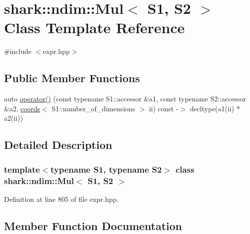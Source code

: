 \hypertarget{classshark_1_1ndim_1_1_mul}{}\section{shark\+:\+:ndim\+:\+:Mul$<$ S1, S2 $>$ Class Template Reference}
\label{classshark_1_1ndim_1_1_mul}


{\ttfamily \#include $<$expr.\+hpp$>$}

\subsection*{Public Member Functions}
\begin{DoxyCompactItemize}
\item 
auto \hyperlink{classshark_1_1ndim_1_1_mul_aa9fc86ff1e8093c5f9c219f5f01d0428}{operator()} (const typename S1\+::accessor \&a1, const typename S2\+::accessor \&a2, \hyperlink{structshark_1_1ndim_1_1coords}{coords}$<$ S1\+::number\+\_\+of\+\_\+dimensions $>$ ii) const -\/$>$ decltype(a1(ii) $\ast$a2(ii))
\end{DoxyCompactItemize}


\subsection{Detailed Description}
\subsubsection*{template$<$typename S1, typename S2$>$\newline
class shark\+::ndim\+::\+Mul$<$ S1, S2 $>$}



Definition at line 805 of file expr.\+hpp.



\subsection{Member Function Documentation}
\hypertarget{classshark_1_1ndim_1_1_mul_aa9fc86ff1e8093c5f9c219f5f01d0428}{}\label{classshark_1_1ndim_1_1_mul_aa9fc86ff1e8093c5f9c219f5f01d0428} 
